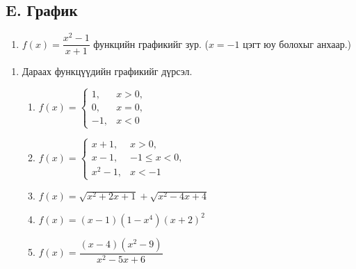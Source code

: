 \subsection*{E. График}
\begin{enumerate}[resume]
\item $f(x)=\dfrac{x^2-1}{x+1}$ функцийн графикийг зур. ($x=-1$ цэгт юу болохыг анхаар.)
\end{enumerate}

\begin{enumerate}[resume]
\item Дараах функцүүдийн графикийг дүрсэл.
\begin{enumerate}
  \item $f(x)=\begin{cases}1, & x>0,\\ 0, & x=0,\\ -1, & x<0\end{cases}$
  \item $f(x)=\begin{cases}x+1, & x>0,\\ x-1, & -1\le x<0,\\ x^2-1, & x<-1\end{cases}$
  \item $f(x)=\sqrt{x^2+2x+1}+\sqrt{x^2-4x+4}$
  \item $f(x)=(x-1)(1-x^4)(x+2)^2$
  \item $f(x)=\dfrac{(x-4)(x^2-9)}{x^2-5x+6}$
\end{enumerate}
\end{enumerate}